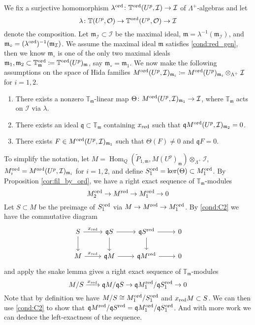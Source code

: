 \documentclass[leqno]{amsart}
\theoremstyle{definition}
\theoremstyle{remark}
\newcommand{\oo}{\mathcal{O}}
\DeclareMathOperator{\Hom}{Hom}
\newcommand{\fm}{\mathfrak{m}}
\newcommand{\fq}{\mathfrak{q}}
\newcommand{\red}{\textnormal{red}}
\newcommand{\xx}{x_\textnormal{red}}
\newcommand{\TT}{\mathbb{T}} %
\newcommand{\I}{\mathcal{I}} %
\newcommand{\ord}{\textnormal{ord}} %
\begin{document}
We fix a surjective homomorphism 
$\lambda^{\ord}\colon \TT^{\ord}(U^p,\I)\to\I$
of $\Lambda^+$-algebras and let 
\begin{equation*}
    \lambda\colon 
    \TT(U^p,\oo)\to
    \TT^{\ord}(U^p,\oo)\to\I
\end{equation*}
denote the composition. 
Let $\fm_\I\subset\I$ be the maximal ideal,
$\fm=\lambda^{-1}(\fm_\I)$, and $\fm_\circ=(\lambda^\ord)^{-1}(\fm_\I)$.
We assume the maximal ideal
$\fm$ satisfies \eqref{cond:red_gen},
then we know $\fm_\circ$ is one of the only two maximal 
ideals $\fm_1,\fm_2\subset \TT^{\ord}_\fm\coloneqq\TT^{\ord}(U^p)_\fm$,
say $\fm_\circ=\fm_1$.
We now make the following assumptions on the space of Hida families
$M^{\ord}(U^p,\I)_{\fm_i}\coloneqq
M^{\ord}(U^p)_{\fm_i}\otimes_{\Lambda^+}\I$ for $i=1,2$.
\begin{enumerate}[label=(C\arabic*)]
\item There exists a nonzero $\TT_\fm$-linear map
$\Theta\colon M^{\ord}(U^p,\I)_{\fm_1}\to \I$,
where $\TT_\fm$ acts on $\I$ via $\lambda$.
\label{cond:C1}
\item There exists an ideal $\fq\subset \TT_{\fm}$
containing $\xx$ such that $\fq M^{\ord}(U^p,\I)_{\fm_2}=0$.
\label{cond:C2}
\item There exists $F\in M^{\ord}(U^p,\I)_{\fm_1}$
such that $\Theta(F)\neq0$ and $\fq F=0$.
\label{cond:C3}
\end{enumerate}

To simplify the notation, let 
$M=\Hom_{Q}(\tilde{P}_{1,\fm},M(U^p)_{\fm})\otimes_{\Lambda^+}\I$,
$M_i^{\ord}=M^{\ord}(U^p,\I)_{\fm_i}$ for $i=1,2$, and
define $S_1^{\ord}=\ker(\Theta)\subset M_1^{\ord}$.
By Proposition \ref{cor:fil_by_ord}, 
we have a right exact sequence of $\TT_\fm$-modules
\begin{equation*}
    M_2^{\ord}\to M^\red\to M_1^{\ord}\to 0
\end{equation*}
Let $S\subset M$ be the preimage of $S_1^{\ord}$ via
$M\to M^\red\to M_1^{\ord}$.
By \ref{cond:C2}
we have the commutative diagram
\[
\begin{tikzcd}
	S\arrow[r,"\xx"] \arrow[d]
	& \fq S \arrow[r] \arrow[d]
	& \fq S^{\red} \arrow[r] \arrow[d] & 0\\
	M\arrow[r,"\xx"]
	& \fq M \arrow[r]
	& \fq M^{\red} \arrow[r] & 0
\end{tikzcd}
\]
and apply the snake lemma gives a right exact sequence of $\TT_\fm$-modules
\begin{equation*}
	M/S\xrightarrow{\xx} \fq M/\fq S\to 
	\fq M_1^\red/\fq S_1^\red \to 0
\end{equation*}
Note that by definition we have $M/S\cong M_1^\ord/S_1^\ord$
and $\xx M\subset S$. We can then use \ref{cond:C2} to show that
$\fq M^{\red}/\fq S^{\red}=\fq M_1^{\ord}/\fq S_1^{\ord}$.
And with more work we can deduce the left-exactness of the sequence.
\end{document}

